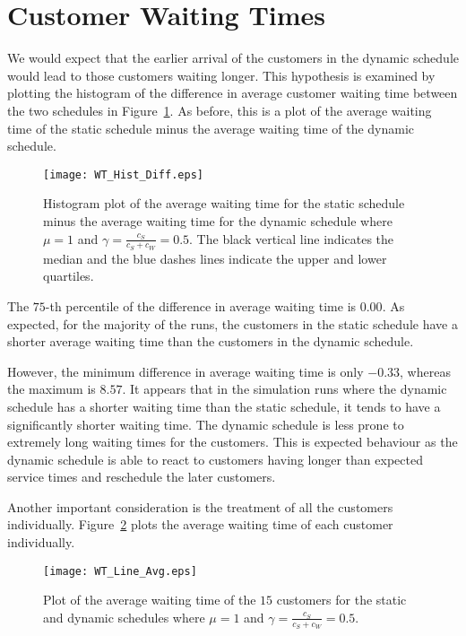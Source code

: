 \section{Customer Waiting Times}
We would expect that the earlier arrival of the customers in the dynamic schedule would lead to those customers waiting longer. This hypothesis is examined by plotting the histogram of the difference in average customer waiting time between the two schedules in Figure~\ref{fig:Diff_Wait}. As before, this is a plot of the average waiting time of the static schedule minus the average waiting time of the dynamic schedule.
\begin{figure}[htb]
	\centering
	\texttt{[image: WT\_Hist\_Diff.eps]}
	\caption{Histogram plot of the average waiting time for the static schedule minus the average waiting time for the dynamic schedule where $\mu = 1$ and $\gamma = \frac{c_{S}}{c_{S} + c_{W}} = 0.5$. The black vertical line indicates the median and the blue dashes lines indicate the upper and lower quartiles.}
	\label{fig:Diff_Wait}
\end{figure}

The $75$-th percentile of the difference in average waiting time is $0.00$. As expected, for the majority of the runs, the customers in the static schedule have a shorter average waiting time than the customers in the dynamic schedule.

However, the minimum difference in average waiting time is only $-0.33$, whereas the maximum is $8.57$. It appears that in the simulation runs where the dynamic schedule has a shorter waiting time than the static schedule, it tends to have a significantly shorter waiting time. The dynamic schedule is less prone to extremely long waiting times for the customers. This is expected behaviour as the dynamic schedule is able to react to customers having longer than expected service times and reschedule the later customers.

Another important consideration is the treatment of all the customers individually. Figure~\ref{fig:Avg_Wait_Position} plots the average waiting time of each customer individually.
\begin{figure}[htb]
	\centering
	\texttt{[image: WT\_Line\_Avg.eps]}
	\caption{Plot of the average waiting time of the $15$ customers for the static and dynamic schedules where $\mu = 1$ and $\gamma = \frac{c_{S}}{c_{S} + c_{W}} = 0.5$.}
	\label{fig:Avg_Wait_Position}
\end{figure}

